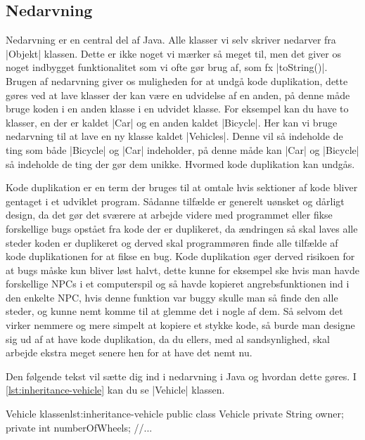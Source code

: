 \subsection{Nedarvning}

Nedarvning er en central del af Java. Alle klasser vi selv skriver nedarver fra \JavaInline|Objekt| klassen. Dette er ikke noget vi mærker så meget til, men det giver os noget indbygget funktionalitet som vi ofte gør brug af, som fx \JavaInline|toString()|. Brugen af nedarvning giver os muligheden for at undgå kode duplikation, dette gøres ved at lave klasser der kan være en udvidelse af en anden, på denne måde bruge koden i en anden klasse i en udvidet klasse. For eksempel kan du have to klasser, en der er kaldet \JavaInline|Car| og en anden kaldet \JavaInline|Bicycle|. Her kan vi bruge nedarvning til at lave en ny klasse kaldet \JavaInline|Vehicles|. Denne vil så indeholde de ting som både \JavaInline|Bicycle| og \JavaInline|Car| indeholder, på denne måde kan \JavaInline|Car| og \JavaInline|Bicycle| så indeholde de ting der gør dem unikke. Hvormed kode duplikation kan undgås.

Kode duplikation er en term der bruges til at omtale hvis sektioner af kode bliver gentaget i et udviklet program. Sådanne tilfælde er generelt uønsket og dårligt design, da det gør det sværere at arbejde videre med programmet eller fikse forskellige bugs opstået fra kode der er duplikeret, da ændringen så skal laves alle steder koden er duplikeret og derved skal programmøren finde alle tilfælde af kode duplikationen for at fikse en bug. Kode duplikation øger derved risikoen for at bugs måske kun bliver løst halvt, dette kunne for eksempel ske hvis man havde forskellige NPCs i et computerspil og så havde kopieret angrebsfunktionen ind i den enkelte NPC, hvis denne funktion var buggy skulle man så finde den alle steder, og kunne nemt komme til at glemme det i nogle af dem. Så selvom det virker nemmere og mere simpelt at kopiere et stykke kode, så burde man designe sig ud af at have kode duplikation, da du ellers, med al sandsynlighed, skal arbejde ekstra meget senere hen for at have det nemt nu.

Den følgende tekst vil sætte dig ind i nedarvning i Java og hvordan dette gøres. I \autoref{lst:inheritance-vehicle} kan du se \JavaInline|Vehicle| klassen.

\begin{JavaCode}{Vehicle klassen}{lst:inheritance-vehicle}
	public class Vehicle
	{
		private String owner;
		private int numberOfWheels;
		//...
	}
\end{JavaCode}
	
